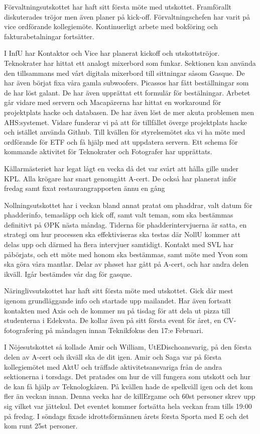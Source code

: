 \documentclass[10pt]{article}
\begin{document}
\begin{paragrafer}
\begin{paragrafer}
Förvaltningsutskottet har haft sitt första möte med utskottet. Framförallt diskuterades tröjor men även planer på kick-off. Förvaltningschefen har varit på vice ordförande kollegiemöte. Kontinuerligt arbete med bokföring och fakturabetalningar fortsätter.

I InfU har Kontaktor och Vice har planerat kickoff och utskottströjor.
Teknokrater har hittat ett analogt mixerbord som funkar. Sektionen kan använda den tillsammans med vårt digitala mixerbord till sittningar såsom Gasque. De har även börjat fixa våra gamla subwoofers.
Picassos har fått beställningar som de har löst galant. De har även upprättat ett formulär för bestälningar.
Arbetet går vidare med servern och Macapärerna har hittat en workaround för projektplats hacke och databasen. De har även löst de mer akuta problemen men AHS:systemet.
Vidare funderar vi på att för tillfället överge projektplats hacke och istället använda Github.
Till kvällen för styrelsemötet ska vi ha möte med ordförande för ETF och få hjälp med att uppdatera servern.
Ett schema för kommande aktivitet för Teknokrater och Fotografer har upprättats.

Källarmästeriet har legat lågt en vecka då det var svårt att hålla gille under KPL. Alla krögare har snart genomgått A-cert. De också har planerat inför fredag samt fixat restaurangrapporten ännu en gång

Nollningsutskottet har i veckan bland annat pratat om phaddrar, valt datum för phadderinfo, temasläpp och kick off, samt valt teman, som ska bestämmas definitivt på ØPK nästa måndag. Tiderna för phadderintervjuerna är satta, en strategi om hur processen ska effektiviseras ska testas där NollU kommer att delas upp och därmed ha flera intervjuer samtidigt. 
Kontakt med SVL har påbörjats, och ett möte med honom ska bestämmas, samt möte med Yvon som ska göra våra mantlar. 
Delar av phøset har gått på A-cert, och har andra delen ikväll. Igår bestämdes vår dag för gasque.

Näringlivsutskottet har haft sitt första möte med utskottet. Gick där mest igenom grundläggande info och startade upp mailandet. Har även fortsatt kontakten med Axis och de kommer nu på tisdag för att dela ut pizza till studenterna i Edekvata. De kollar även på sitt första event för året, en CV-fotografering på måndagen innan Teknikfokus den 17:e Februari.

I Nöjesutskottet så kollade Amir och William, UtEDischoansvarig, på den första delen av A-cert och ikväll ska de dit igen. Amir och Saga var på första kollegiemötet med AktU och träffade aktivitetsansvariga från de andra sektionerna i torsdags. Det pratades om hur de vill fungera som utskott och hur de kan få hjälp av Teknologkåren. På kvällen hade de spelkväll igen och det kom fler än veckan innan. Denna vecka har de killErgame och 60st personer skrev upp sig vilket var jättekul. Det eventet kommer fortsätta hela veckan fram tills 19:00 på fredag. I söndags fixade idrottsförmännen årets första Sporta med E och det kom runt 25st personer. 


\end{paragrafer}
\end{paragrafer}
\end{document}
